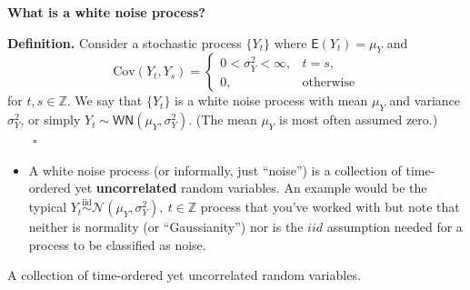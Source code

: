 \documentclass[
  letterpaper,
  DIV=11,
  numbers=noendperiod]{scrartcl}
\providecommand{\tightlist}{%
  \setlength{\itemsep}{0pt}\setlength{\parskip}{0pt}}
\newcommand{\slidelabel}[1]{{\color{embernavy}\bfseries\large #1\par\vspace{5pt}}}
\newenvironment{slidefooter}{%
  \par\vspace{7pt}{\color{emberrule}\rule{\linewidth}{0.4pt}}\par\vspace{4pt}%
  \color{emberamber}\itshape\small}{\par}
\begin{document}
\begin{slidebox}

\slidelabel{What is a white noise process?}

\textbf{Definition.} Consider a stochastic process \(\{Y_t\}\) where
\(\mathsf{E}(Y_t) = \mu_Y\) and
\[\text{Cov}(Y_t, Y_s) = \begin{cases} 0 < \sigma_Y^2 < \infty, & t = s, \\ 0, & \text{otherwise} \end{cases}\]
for \(t, s \in \mathbb{Z}\). We say that \(\{Y_t\}\) is a white noise
process with mean \(\mu_Y\) and variance \(\sigma_Y^2\), or simply
\(Y_t \sim \mathsf{WN}\left(\mu_Y, \sigma_Y^2\right)\). (The mean
\(\mu_Y\) is most often assumed zero.) \(\qquad\square\)

\begin{itemize}
\tightlist
\item
  A white noise process (or informally, just ``noise'') is a collection
  of time-ordered yet \textbf{uncorrelated} random variables. An example
  would be the typical
  \(Y_t \overset{\scriptscriptstyle\text{iid}}{\sim} \mathcal{N}\left(\mu_Y, \sigma_Y^2\right),\ t \in \mathbb{Z}\)
  process that you've worked with but note that neither is normality (or
  ``Gaussianity'') nor is the \(iid\) assumption needed for a process to
  be classified as noise.
\end{itemize}

\begin{slidefooter}

A collection of time-ordered yet uncorrelated random variables.

\end{slidefooter}

\end{slidebox}
\end{document}
